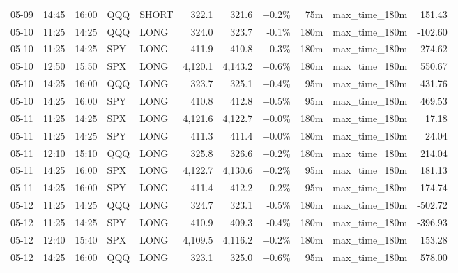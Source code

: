 \documentclass[11pt,a4paper,twoside]{article}
\begin{document}
\begin{center}
\begin{longtable}{>{\color{txtmain}}l l l l l r r r r >{\color{txtmain}}l r}
05-09 & 14:45 & 16:00 & QQQ & SHORT & 322.1 & 321.6 & \textcolor{wingreen}{+0.2\%} & 75m & max\_time\_180m & \textcolor{wingreen}{151.43} \\
05-10 & 11:25 & 14:25 & QQQ & LONG & 324.0 & 323.7 & \textcolor{lossred}{-0.1\%} & 180m & max\_time\_180m & \textcolor{lossred}{-102.60} \\
05-10 & 11:25 & 14:25 & SPY & LONG & 411.9 & 410.8 & \textcolor{lossred}{-0.3\%} & 180m & max\_time\_180m & \textcolor{lossred}{-274.62} \\
05-10 & 12:50 & 15:50 & SPX & LONG & 4,120.1 & 4,143.2 & \textcolor{wingreen}{+0.6\%} & 180m & max\_time\_180m & \textcolor{wingreen}{550.67} \\
05-10 & 14:25 & 16:00 & QQQ & LONG & 323.7 & 325.1 & \textcolor{wingreen}{+0.4\%} & 95m & max\_time\_180m & \textcolor{wingreen}{431.76} \\
05-10 & 14:25 & 16:00 & SPY & LONG & 410.8 & 412.8 & \textcolor{wingreen}{+0.5\%} & 95m & max\_time\_180m & \textcolor{wingreen}{469.53} \\
05-11 & 11:25 & 14:25 & SPX & LONG & 4,121.6 & 4,122.7 & \textcolor{wingreen}{+0.0\%} & 180m & max\_time\_180m & \textcolor{wingreen}{17.18} \\
05-11 & 11:25 & 14:25 & SPY & LONG & 411.3 & 411.4 & \textcolor{wingreen}{+0.0\%} & 180m & max\_time\_180m & \textcolor{wingreen}{24.04} \\
05-11 & 12:10 & 15:10 & QQQ & LONG & 325.8 & 326.6 & \textcolor{wingreen}{+0.2\%} & 180m & max\_time\_180m & \textcolor{wingreen}{214.04} \\
05-11 & 14:25 & 16:00 & SPX & LONG & 4,122.7 & 4,130.6 & \textcolor{wingreen}{+0.2\%} & 95m & max\_time\_180m & \textcolor{wingreen}{181.13} \\
05-11 & 14:25 & 16:00 & SPY & LONG & 411.4 & 412.2 & \textcolor{wingreen}{+0.2\%} & 95m & max\_time\_180m & \textcolor{wingreen}{174.74} \\
05-12 & 11:25 & 14:25 & QQQ & LONG & 324.7 & 323.1 & \textcolor{lossred}{-0.5\%} & 180m & max\_time\_180m & \textcolor{lossred}{-502.72} \\
05-12 & 11:25 & 14:25 & SPY & LONG & 410.9 & 409.3 & \textcolor{lossred}{-0.4\%} & 180m & max\_time\_180m & \textcolor{lossred}{-396.93} \\
05-12 & 12:40 & 15:40 & SPX & LONG & 4,109.5 & 4,116.2 & \textcolor{wingreen}{+0.2\%} & 180m & max\_time\_180m & \textcolor{wingreen}{153.28} \\
05-12 & 14:25 & 16:00 & QQQ & LONG & 323.1 & 325.0 & \textcolor{wingreen}{+0.6\%} & 95m & max\_time\_180m & \textcolor{wingreen}{578.00} \\

\end{longtable}
\end{center}
\end{document}
